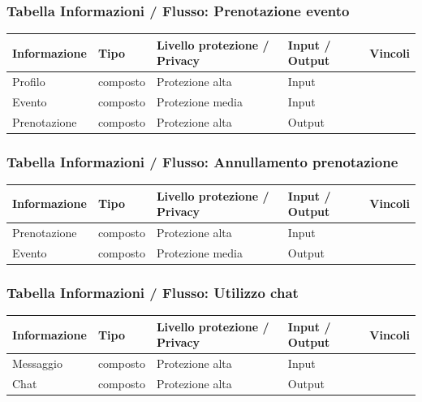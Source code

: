 \documentclass[12pt,a4paper]{report}
\begin{document}
\subsubsection{Tabella Informazioni / Flusso: Prenotazione evento}
\begin{tabularx}{\textwidth}{|X|X|X|X|X|}
    \hline
    \rowcolor{studyColor} \textbf{Informazione} & \textbf{Tipo} & \textbf{Livello protezione / Privacy} & \textbf{Input / Output} & \textbf{Vincoli} \\ \hline
    \endhead
    Profilo & composto & Protezione alta & Input & \\ \hline
    Evento & composto & Protezione media & Input & \\ \hline
    Prenotazione & composto & Protezione alta & Output & \\ \hline
\end{tabularx}

\subsubsection{Tabella Informazioni / Flusso: Annullamento prenotazione}
\begin{tabularx}{\textwidth}{|X|X|X|X|X|}
    \hline
    \rowcolor{studyColor} \textbf{Informazione} & \textbf{Tipo} & \textbf{Livello protezione / Privacy} & \textbf{Input / Output} & \textbf{Vincoli} \\ \hline
    \endhead
    Prenotazione & composto & Protezione alta & Input & \\ \hline
    Evento & composto & Protezione media & Output & \\ \hline
\end{tabularx}

\subsubsection{Tabella Informazioni / Flusso: Utilizzo chat}
\begin{tabularx}{\textwidth}{|X|X|X|X|X|}
    \hline
    \rowcolor{studyColor} \textbf{Informazione} & \textbf{Tipo} & \textbf{Livello protezione / Privacy} & \textbf{Input / Output} & \textbf{Vincoli} \\ \hline
    \endhead
    Messaggio & composto & Protezione alta & Input & \\ \hline
    Chat & composto & Protezione alta & Output & \\ \hline
\end{tabularx}
\end{document}
